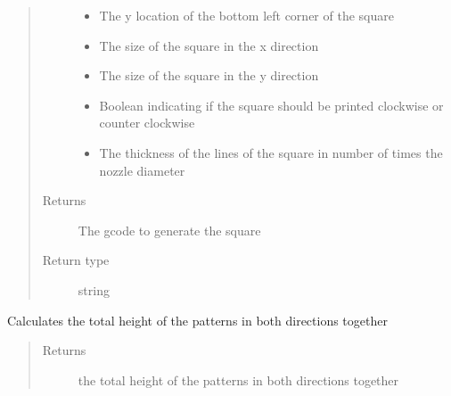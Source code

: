 \documentclass[letterpaper,10pt,english]{sphinxmanual}
\begin{document}
\begin{fulllineitems}
\begin{fulllineitems}
\begin{quote}
\begin{description}
\begin{itemize}
\item {} 
\sphinxAtStartPar
{} \textendash{} The y location of the bottom left corner of the square

\item {} 
\sphinxAtStartPar
{} \textendash{} The size of the square in the x direction

\item {} 
\sphinxAtStartPar
{} \textendash{} The size of the square in the y direction

\item {} 
\sphinxAtStartPar
{} \textendash{} Boolean indicating if the square should be printed clockwise or counter clockwise

\item {} 
\sphinxAtStartPar
{} \textendash{} The thickness of the lines of the square in number of times the nozzle diameter

\end{itemize}

\item[{Returns}] \leavevmode
\sphinxAtStartPar
The gcode to generate the square

\item[{Return type}] \leavevmode
\sphinxAtStartPar
string

\end{description}\end{quote}

\end{fulllineitems}


\begin{fulllineitems}
\label{\detokenize{index:calibration_pattern.calibration_pattern.total_height}}
\sphinxAtStartPar
Calculates the total height of the patterns in both directions together
\begin{quote}\begin{description}
\item[{Returns}] \leavevmode
\sphinxAtStartPar
the total height of the patterns in both directions together


\end{description}
\end{quote}
\end{fulllineitems}
\end{fulllineitems}
\end{document}
